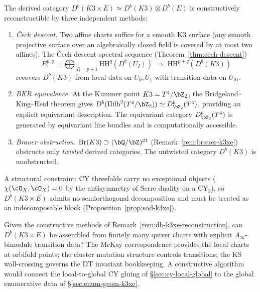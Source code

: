 \begin{remark}
\label{rem:db-k3xe-reconstruction}
The derived category $D^b(K3 \times E) \simeq D^b(K3) \otimes
D^b(E)$ is constructively reconstructible by three independent
methods:
\begin{enumerate}[label=\textup{(\roman*)}]
\item \emph{\v{C}ech descent.}
Two affine charts suffice for a smooth K3 surface
\textup{(}any smooth projective surface over an algebraically
closed field is covered by at most two affines\textup{)}.
The \v{C}ech descent spectral sequence
\textup{(}Theorem~\textup{\ref{thm:cech-descent})}
\[
E_1^{p,q} = \bigoplus_{|I|=p+1}
 \mathrm{HH}^q(D^b(U_I))
\;\Longrightarrow\;
\mathrm{HH}^{p+q}(D^b(K3))
\]
recovers $D^b(K3)$ from local data on $U_0, U_1$
with transition data on $U_{01}$.
\item \emph{BKR equivalence.}
At the Kummer point $K3 = T^4/\bZ_2$, the
Bridgeland--King--Reid theorem gives
$D^b(\operatorname{Hilb}^2(T^4/\bZ_2)) \simeq
D^b_{\bZ_2}(T^4)$, providing an explicit equivariant
description. The equivariant category
$D^b_{\bZ_2}(T^4)$ is generated by equivariant
line bundles and is computationally accessible.
\item \emph{Brauer obstruction.}
$\mathrm{Br}(K3) \supset (\bQ/\bZ)^{21}$
\textup{(}Remark~\textup{\ref{rem:brauer-k3xe})} obstructs
only \emph{twisted} derived categories. The
untwisted category $D^b(K3)$ is unobstructed.
\end{enumerate}
A structural constraint: CY threefolds carry no exceptional
objects \textup{(}$\chi(\cO_X, \cO_X) = 0$ by the
antisymmetry of Serre duality on a CY$_3$\textup{)}, so
$D^b(K3 \times E)$ admits no semiorthogonal decomposition
and must be treated as an indecomposable block
\textup{(}Proposition~\textup{\ref{prop:sod-k3xe})}.
\end{remark}

\begin{openproblem}
\label{op:global-cy-category}
Given the constructive methods of
Remark~\ref{rem:db-k3xe-reconstruction}, can
$D^b(K3 \times E)$ be assembled from finitely many quiver
charts with explicit $A_\infty$-bimodule transition data?
The McKay correspondence provides the local charts at
orbifold points; the cluster mutation structure controls
transitions; the KS wall-crossing governs the DT invariant
bookkeeping. A constructive algorithm would connect the
local-to-global CY gluing of
\S\ref{sec:cy-local-global} to the global enumerative data of
\S\ref{sec:enum-geom-k3xe}.
\end{openproblem}



